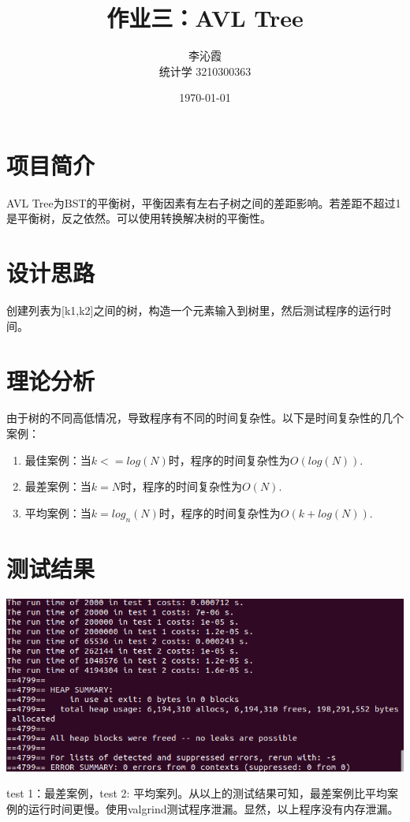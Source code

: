 \documentclass[a4paper]{article}
\title{作业三：AVL Tree}
\author{李沁霞 \\ 统计学 3210300363}
\date{\today}
\begin{document}
\maketitle

\section{项目简介}
AVL Tree为BST的平衡树，平衡因素有左右子树之间的差距影响。若差距不超过1是平衡树，反之依然。可以使用转换解决树的平衡性。

\section{设计思路}
创建列表为[k1,k2]之间的树，构造一个元素输入到树里，然后测试程序的运行时间。

\section{理论分析}
由于树的不同高低情况，导致程序有不同的时间复杂性。以下是时间复杂性的几个案例：
\begin{enumerate}
    \item 最佳案例：当$k <= log(N)$时，程序的时间复杂性为$O(log(N))$.
    \item 最差案例：当$k = N$时，程序的时间复杂性为$O(N)$.
    \item 平均案例：当$k = log_{n}(N)$时，程序的时间复杂性为$O(k + log(N))$.
\end{enumerate}

\section{测试结果}
\includegraphics[scale = 0.5]{memory leak}

test 1：最差案例，test 2: 平均案列。从以上的测试结果可知，最差案例比平均案例的运行时间更慢。使用valgrind测试程序泄漏。显然，以上程序没有内存泄漏。
\end{document}
